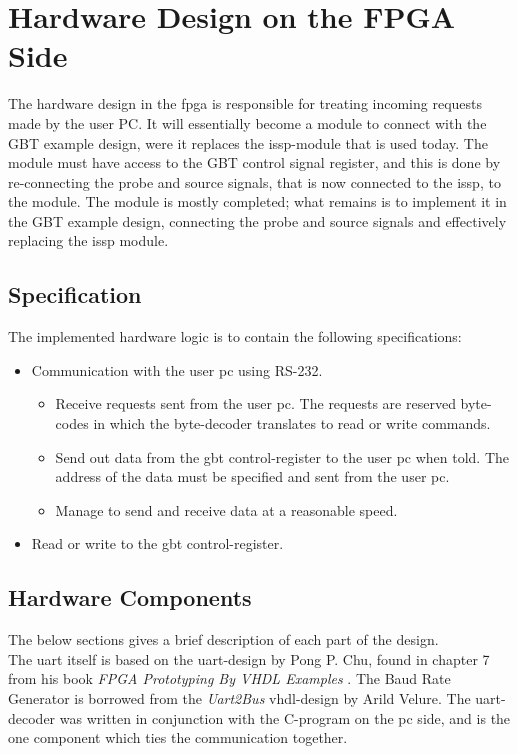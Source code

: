 \documentclass[main.tex]{subfiles}
\begin{document}
\section{Hardware Design on the FPGA Side} \label{chap:hardware}

The hardware design in the \gls{fpga} is responsible for treating incoming requests made by the user PC. It will essentially become a module to connect with the GBT example design, were it replaces the \gls{issp}-module that is used today. The module must have access to the GBT control signal register, and this is done by re-connecting the probe and source signals, that is now connected to the \gls{issp}, to the module. The module is mostly completed; what remains is to implement it in the GBT example design, connecting the probe and source signals and effectively replacing the \gls{issp} module. 

\subsection{Specification}

The implemented hardware logic is to contain the following specifications:\\
\begin{itemize} \setlength{\itemsep}{10pt}
\item Communication with the user \acrshort{pc} using RS-232.
  \begin{itemize}
  \item Receive requests sent from the user \acrshort{pc}. The requests are reserved byte-codes in which the byte-decoder translates to read or write commands. 
  \item Send out data from the \gls{gbt} control-register to the user \acrshort{pc} when told. The address of the data must be specified and sent from the user \acrshort{pc}.
  \item Manage to send and receive data at a reasonable speed. 
  \end{itemize}
\item Read or write to the \gls{gbt} control-register.
\end{itemize}

\subsection{Hardware Components}

The below sections gives a brief description of each part of the design.\\
The \gls{uart} itself is based on the \gls{uart}-design by Pong P. Chu, found in chapter 7 from his book \textit{FPGA Prototyping By VHDL Examples} \cite{chu08}. The Baud Rate Generator is borrowed from the \textit{Uart2Bus} \acrshort{vhdl}-design by Arild Velure. The \gls{uart}-decoder was written in conjunction with the C-program on the \acrshort{pc} side, and is the one component which ties the communication together.\\
\end{document}
